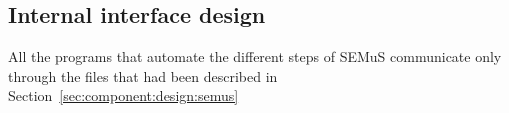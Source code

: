 




\subsection{Internal interface design}

All the programs that automate the different steps of SEMuS communicate only through the files that had been described in Section~\ref{sec:component:design:semus}


